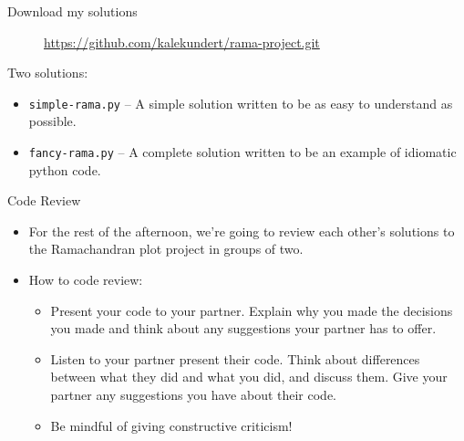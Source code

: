 \begin{frame}{Download my solutions}

 \begin{figure}[h]
  {\large \url{https://github.com/kalekundert/rama-project.git}}
 \end{figure}

 Two solutions:

 \begin{itemize}

  \item \texttt{simple-rama.py} -- A simple solution written to be as easy to 
   understand as possible.

  \item \texttt{fancy-rama.py} -- A complete solution written to be an example 
   of idiomatic python code.
  
 \end{itemize}

\end{frame}

\begin{frame}{Code Review}

 \begin{itemize}

  \item For the rest of the afternoon, we're going to review each other's 
   solutions to the Ramachandran plot project in groups of two.

  \item How to code review:

   \begin{itemize}

    \item Present your code to your partner.  Explain why you made the 
     decisions you made and think about any suggestions your partner has to 
     offer.

    \item Listen to your partner present their code.  Think about differences 
     between what they did and what you did, and discuss them.  Give your 
     partner any suggestions you have about their code.

    \item Be mindful of giving constructive criticism!

   \end{itemize}

 \end{itemize}

\end{frame}

